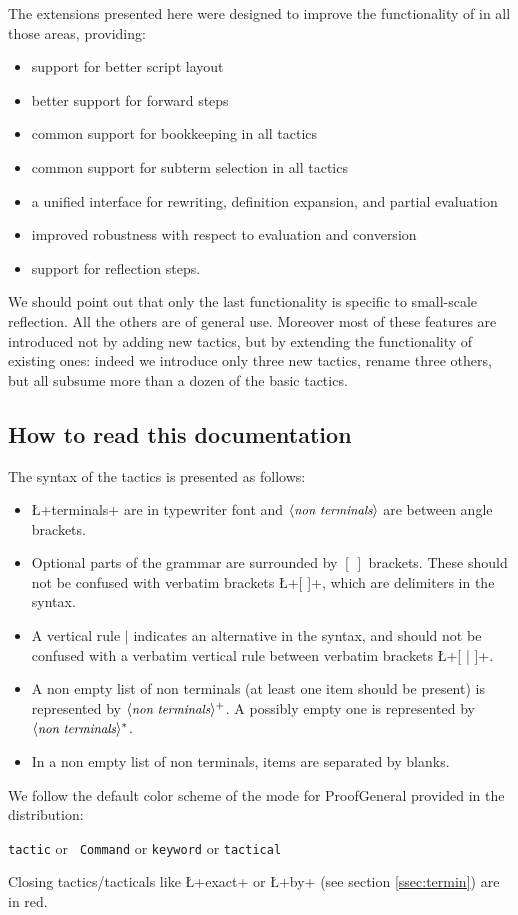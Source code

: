 The extensions presented here were designed to improve the
functionality of \Coq{} in all those areas, providing:

\begin{itemize}
\item support for better script layout
\item better support for forward steps
\item common
support for bookkeeping in all tactics
\item common support for subterm
selection in all tactics
\item a unified interface for rewriting,
definition expansion, and partial evaluation
\item improved robustness
with respect to evaluation and conversion
\item support for reflection
steps.
\end{itemize}
 We should point out that only the last functionality is specific
to small-scale reflection. All the others are of general use.
Moreover most of these features are introduced not
by adding new tactics, but by extending the functionality of existing
ones: indeed we introduce only three new tactics, rename three others,
but all subsume more than a dozen of the basic \Coq{} tactics.


\subsection*{How to read this documentation}


The syntax of the tactics is presented as follows:
\begin{itemize}
\item \L+terminals+ are in typewriter font and $\langle\mbox{\itshape\rmfamily\small non terminals}\rangle$ are
  between angle brackets.
\item Optional parts of the grammar are surrounded by $[\ ]$
  brackets. These should not be confused with verbatim brackets
  \L+[ ]+, which are delimiters in the \ssr{} syntax.
\item A vertical rule $|$ indicates an alternative in the syntax, and
  should not be confused with a
  verbatim vertical rule between verbatim brackets \L+[ | ]+.
\item A non empty list of non terminals (at least one item should be
  present) is represented by $\langle\mbox{\itshape\rmfamily\small non terminals}\rangle^+$. A possibly empty
  one is represented by $\langle\mbox{\itshape\rmfamily\small non terminals}\rangle^*$.
\item In a non empty list of non terminals, items are separated by blanks.
\end{itemize}


\noindent We follow the default color scheme of the \ssr{} mode for
ProofGeneral provided in the distribution:

\centerline{
\textcolor{dkblue}{\texttt{tactic}} or \textcolor{dkviolet}{\tt
  Command} or \textcolor{dkgreen}{\tt keyword} or
\textcolor{dkpink}{\tt tactical}}

\noindent Closing tactics/tacticals like \L+exact+ or \L+by+ (see section
\ref{ssec:termin}) are in red.

\newpage
